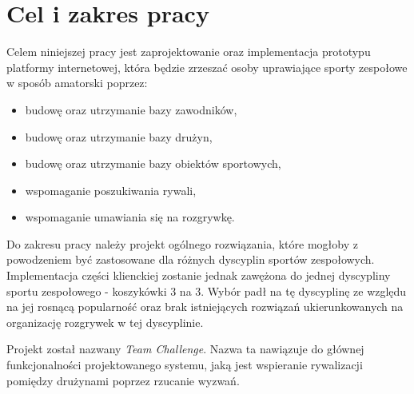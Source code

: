 \section{Cel i zakres pracy}

Celem niniejszej pracy jest zaprojektowanie oraz implementacja prototypu platformy internetowej, która będzie zrzeszać osoby uprawiające sporty zespołowe w sposób amatorski poprzez:

\begin{itemize}
  \item budowę oraz utrzymanie bazy zawodników,
  \item budowę oraz utrzymanie bazy drużyn,
  \item budowę oraz utrzymanie bazy obiektów sportowych,
  \item wspomaganie poszukiwania rywali,
  \item wspomaganie umawiania się na rozgrywkę.
\end{itemize} 

Do zakresu pracy należy projekt ogólnego rozwiązania, które mogłoby z powodzeniem być zastosowane dla różnych dyscyplin sportów zespołowych. Implementacja części klienckiej zostanie jednak zawężona do jednej dyscypliny sportu zespołowego - koszykówki 3 na 3. Wybór padł na tę dyscyplinę ze względu na jej rosnącą popularność oraz brak istniejących rozwiązań ukierunkowanych na organizację rozgrywek w tej dyscyplinie.

Projekt został nazwany \textit{Team Challenge}. Nazwa ta nawiązuje do głównej funkcjonalności projektowanego systemu, jaką jest wspieranie rywalizacji pomiędzy drużynami poprzez rzucanie wyzwań.

\begin{comment}


Jako dyscyplina została wybrana koszykówka 3 na 3, która jest młodą . Projektowany system został nazwany Team Challenge. Nazwa ta nawiązuje do głównej funkcjonalności systemu jaką jest rzucanie wyzwań. "Team" odnosi się do głównej grupy docelowej systemu czyli drużyn. "Challenge" nawiązuje do funkcjonalności rzucania wyzwań. I coś że rózne formy wyzwań są popularne. IceBucket Challenge itp. I że może budzić z tego powodu zainteresowanie.

Projektowany system został nazwany Team Challenge. 

Ze względu na duży rozwój

TODO O tym że projekt ogólny a implementacja dla wybranej dziedziny a konkretnie koszykówki 3 na 3 która budzi co raz większe zainteresowanie i np będzie na igrzyskach olimpijskich. Wybór ze względu na popularność dyscypliny i brak dla niej istniejącego rozwiązania\cite{JS07}).
\end{comment}


